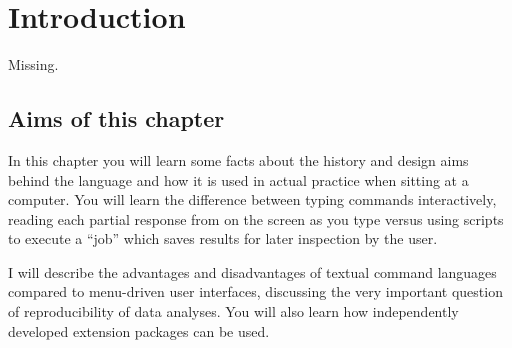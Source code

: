 \documentclass[krantz2]{krantz}\usepackage{knitr}%
\begin{document}

\frontmatter

\maketitle

\newpage


\setcounter{page}{7} %
\tableofcontents
%

\listoffigures
\listoftables
%
%

\mainmatter






\chapter{Introduction}\label{chap:R:introduction}

\begin{VF}
Missing.

\end{VF}


\section{Aims of this chapter}

In this chapter you will learn some facts about the history and design aims behind the \Rlang language and how it is used in actual practice when sitting at a computer. You will learn the difference between typing commands interactively, reading each partial response from \Rlang on the screen as you type versus using scripts to execute a ``job'' which saves results for later inspection by the user.

I will describe the advantages and disadvantages of textual command languages compared to menu-driven user interfaces, discussing the very important question of reproducibility of data analyses. You will also learn how independently developed extension packages can be used.
\end{document}
